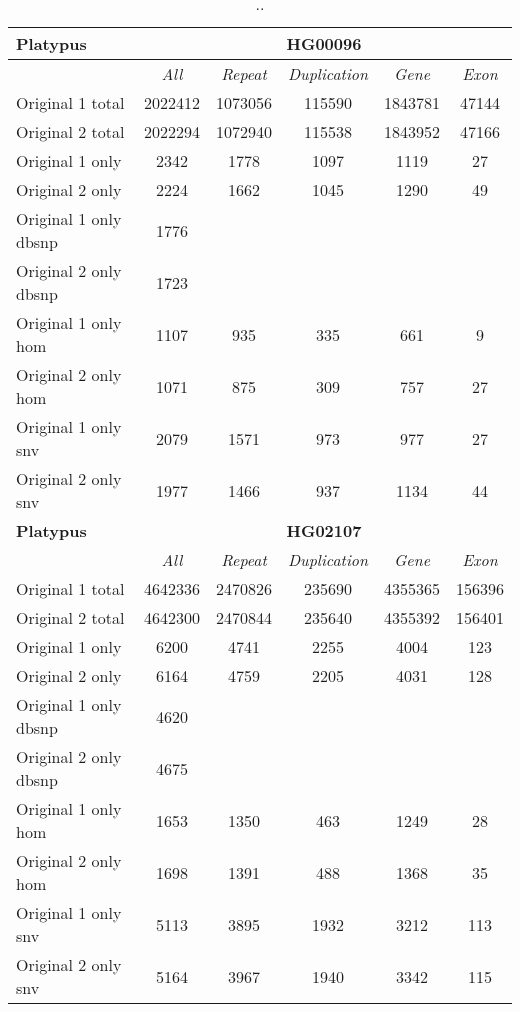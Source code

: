 \begin{table}[htb]
\begin{center}
\begin{tabular}{|l|c||c|c|c|c|}
\hline
{\bf Platypus} & \multicolumn{5}{|c|}{\bf HG00096} \\
\hline
\cline{2-6}
{\bf} & {\it All} & {\it Repeat} & {\it Duplication} & {\it Gene} & {\it Exon} \\
\hline
Original 1 total & 2022412 & 1073056 & 115590 & 1843781 & 47144\\ 
\hline
Original 2 total & 2022294 & 1072940 & 115538 & 1843952 & 47166\\ 
\hline
Original 1 only & 2342 & 1778 & 1097 & 1119 & 27\\ 
\hline
Original 2 only & 2224 & 1662 & 1045 & 1290 & 49\\ 
\hline
Original 1 only dbsnp & 1776 &  &  &  & \\ 
\hline
Original 2 only dbsnp & 1723 &  &  &  & \\ 
\hline
Original 1 only hom & 1107 & 935 & 335 & 661 & 9\\ 
\hline
Original 2 only hom & 1071 & 875 & 309 & 757 & 27\\ 
\hline
Original 1 only snv & 2079 & 1571 & 973 & 977 & 27\\ 
\hline
Original 2 only snv & 1977 & 1466 & 937 & 1134 & 44\\ 
\hline
\hline
{\bf Platypus} & \multicolumn{5}{|c|}{\bf HG02107} \\
\hline
\cline{2-6}
{\bf} & {\it All} & {\it Repeat} & {\it Duplication} & {\it Gene} & {\it Exon} \\
\hline
Original 1 total & 4642336 & 2470826 & 235690 & 4355365 & 156396\\ 
\hline
Original 2 total & 4642300 & 2470844 & 235640 & 4355392 & 156401\\ 
\hline
Original 1 only & 6200 & 4741 & 2255 & 4004 & 123\\ 
\hline
Original 2 only & 6164 & 4759 & 2205 & 4031 & 128\\ 
\hline
Original 1 only dbsnp & 4620 &  &  &  & \\ 
\hline
Original 2 only dbsnp & 4675 &  &  &  & \\ 
\hline
Original 1 only hom & 1653 & 1350 & 463 & 1249 & 28\\ 
\hline
Original 2 only hom & 1698 & 1391 & 488 & 1368 & 35\\ 
\hline
Original 1 only snv & 5113 & 3895 & 1932 & 3212 & 113\\ 
\hline
Original 2 only snv & 5164 & 3967 & 1940 & 3342 & 115\\ 
\hline
\end{tabular}
\end{center}
\caption{ .. }
\label{tab:orig-vs-shuf-platypus}
\end{table}

